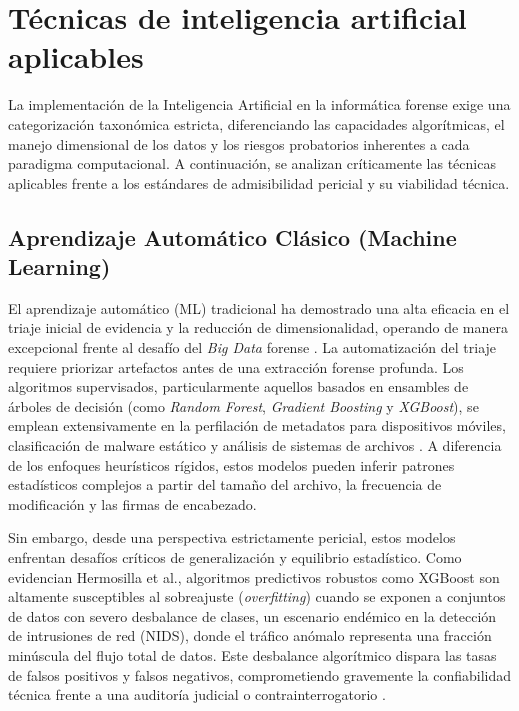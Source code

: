 \documentclass[journal]{IEEEtran}
\begin{document}
\section{Técnicas de inteligencia artificial aplicables}
La implementación de la Inteligencia Artificial en la informática forense exige una categorización taxonómica estricta, diferenciando las capacidades algorítmicas, el manejo dimensional de los datos y los riesgos probatorios inherentes a cada paradigma computacional. A continuación, se analizan críticamente las técnicas aplicables frente a los estándares de admisibilidad pericial y su viabilidad técnica.

\subsection{Aprendizaje Automático Clásico (Machine Learning)}
El aprendizaje automático (ML) tradicional ha demostrado una alta eficacia en el triaje inicial de evidencia y la reducción de dimensionalidad, operando de manera excepcional frente al desafío del \textit{Big Data} forense \cite{QuickDarren2014Ioiv}. La automatización del triaje requiere priorizar artefactos antes de una extracción forense profunda. Los algoritmos supervisados, particularmente aquellos basados en ensambles de árboles de decisión (como \textit{Random Forest}, \textit{Gradient Boosting} y \textit{XGBoost}), se emplean extensivamente en la perfilación de metadatos para dispositivos móviles, clasificación de malware estático y análisis de sistemas de archivos \cite{SerhalCezar2021Mlba}. A diferencia de los enfoques heurísticos rígidos, estos modelos pueden inferir patrones estadísticos complejos a partir del tamaño del archivo, la frecuencia de modificación y las firmas de encabezado.

Sin embargo, desde una perspectiva estrictamente pericial, estos modelos enfrentan desafíos críticos de generalización y equilibrio estadístico. Como evidencian Hermosilla et al., algoritmos predictivos robustos como XGBoost son altamente susceptibles al sobreajuste (\textit{overfitting}) cuando se exponen a conjuntos de datos con severo desbalance de clases, un escenario endémico en la detección de intrusiones de red (NIDS), donde el tráfico anómalo representa una fracción minúscula del flujo total de datos. Este desbalance algorítmico dispara las tasas de falsos positivos y falsos negativos, comprometiendo gravemente la confiabilidad técnica frente a una auditoría judicial o contrainterrogatorio \cite{HermosillaPamela2025UoEA}.
\end{document}
